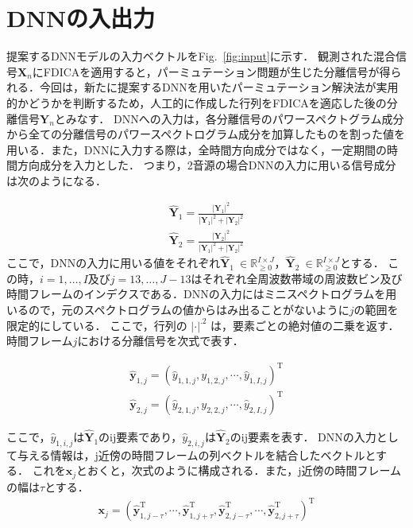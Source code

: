\section{DNNの入出力}
\label{sec:in-out}

提案するDNNモデルの入力ベクトルをFig.~\ref{fig:input}に示す．
観測された混合信号$\bm{X}_n$にFDICAを適用すると，パーミュテーション問題が生じた分離信号が得られる．今回は，新たに提案するDNNを用いたパーミュテーション解決法が実用的かどうかを判断するため，人工的に作成した行列をFDICAを適応した後の分離信号$\bm{Y}_n$とみなす．
DNNへの入力は，各分離信号のパワースペクトグラム成分から全ての分離信号のパワースペクトログラム成分を加算したものを割った値を用いる．また，DNNに入力する際は，全時間方向成分ではなく，一定期間の時間方向成分を入力とした．
つまり，2音源の場合DNNの入力に用いる信号成分は次のようになる．

\begin{align}
    \widehat{\bm{Y}}_1  = \frac{|\bm{Y}_1|^2}{|\bm{Y}_1|^2+|\bm{Y}_2|^2}\\
    \widehat{\bm{Y}}_2  = \frac{|\bm{Y}_2|^2}{|\bm{Y}_1|^2+|\bm{Y}_2|^2}
\end{align}
ここで，DNNの入力に用いる値をそれぞれ$\widehat{\bm{Y}}_1~\in \mathbb{R}_{\geq 0}^{I \times J}$，$\widehat{\bm{Y}}_2 ~\in \mathbb{R}_{\geq 0}^{I \times J}$とする．
この時，$i = 1,\ldots,I$及び$j = 13,\ldots,J-13$はそれぞれ全周波数帯域の周波数ビン及び時間フレームのインデクスである．DNNの入力にはミニスペクトログラムを用いるので，元のスペクトログラムの値からはみ出ることがないように$j$の範囲を限定的にしている．
ここで，行列の $|\cdot|^{.2}$ は，要素ごとの絶対値の二乗を返す．時間フレーム$j$における分離信号を次式で表す．

\begin{align}
    \widehat{\bm{y}}_{1,j}  = (\widehat{y}_{1,1,j},y_{1,2,j}, \cdots, \widehat{y}_{1,I,j} )^\mathrm{T}\\
    \widehat{\bm{y}}_{2,j}  = (\widehat{y}_{2,1,j},y_{2,2,j}, \cdots, \widehat{y}_{2,I,j} )^\mathrm{T}
\end{align}

ここで，$\widehat{y}_{1,i,j}$は$\widehat{\bm{Y}}_1$のij要素であり，$\widehat{y}_{2,i,j}$は$\widehat{\bm{Y}}_2$のij要素を表す．
DNNの入力として与える情報は，j近傍の時間フレームの列ベクトルを結合したベクトルとする．
これを$\bm{x}_j$とおくと，次式のように構成される．また，j近傍の時間フレームの幅は$\tau$とする．
\begin{align}
    \bm{x}_j = (\widehat{\bm{y}}_{1,j-\tau}^\mathrm{T}, \cdots,\widehat{\bm{y}}_{1,j+\tau}^\mathrm{T}, \widehat{\bm{y}}_{2,j-\tau}^\mathrm{T},\cdots,\widehat{\bm{y}}_{2,j+\tau}^\mathrm{T} )^\mathrm{T}
\end{align}

